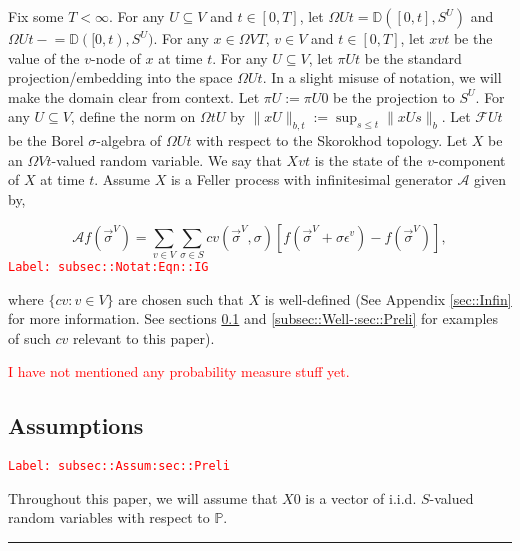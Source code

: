\documentclass[12pt]{article}
\newcommand{\mb}{\mathbb}
\newcommand{\mc}{\mathcal}
\newcommand{\ep}{\epsilon}
\newcommand{\tr}{\textcolor{red}}
\newcommand{\labe}[1]{\tr{\texttt{Label: #1}}}
\newcommand{\ind}{\hspace{24pt}}
\newcommand{\lin}{\rule{\linewidth}{0.4 pt}}
\newcommand{\pr}{\mb{P}}							%
\newcommand{\defeq}{:=}								%
\newcommand{\cad}{\mb{D}}							%
\renewcommand{\v}{v}							%
\renewcommand{\U}{U}							%
\renewcommand{\S}{S}							%
\newcommand{\s}{\sigma}							%
\newcommand{\sv}{\vec{\s}}						%
\renewcommand{\b}{b}							%
\newcommand{\ev}{\ep}							%
\newcommand{\T}{T}								%
\newcommand{\x}{x}								%
\renewcommand{\t}{t}							%
\newcommand{\proj}{\pi}							%
\renewcommand{\tt}{s}							%
\newcommand{\F}{\mc{F}}							%
\newcommand{\X}{X}								%
\newcommand{\IG}{\mc{A}}						%
\newcommand{\IGr}{c}							%
\newcommand{\vind}[1]{^{#1}}					%
\newcommand{\carp}[1]{^{#1}}					%
\newcommand{\vsi}[1]{^{#1}}						%
\newcommand{\cind}[1]{_{#1}}					%
\begin{document}
\ind Fix some \(\T < \infty\). For any \(\U\subseteq V\) and \(\t\in [0,\T]\), let \(\Omega{\U}{\t} = \cad([0,\t],\S\carp{\U})\) and \(\Omega{\U}{\t-} = \cad([0,\t),\S\carp{\U})\). For any \(\x{}{} \in \Omega{V}{\T}\), \(\v\in V\) and  \(\t \in [0,\T]\), let \(\x{\v}{\t}\) be the value of the \(\v\)-node of \(\x{}{}\) at time \(\t\). For any \(\U\subseteq V\), let \(\proj{\U}{\t}\) be the standard projection/embedding into the space \(\Omega{\U}{\t}\). In a slight misuse of notation, we will make the domain clear from context. Let \(\proj{\U}{} \defeq \proj{\U}{0}\) be the projection to \(\S\carp{\U}\). For any \(\U\subseteq V\), define the norm on \(\Omega{\t}{\U}\) by \(\|\x{\U}{}\|_{\b{},\t} \defeq \sup_{\tt \leq \t} \|\x{\U}{\tt}\|_{\b{}}\). Let \(\F{\U}{\t}\) be the Borel \(\sigma\)-algebra of \(\Omega{\U}{\t}\) with respect to the Skorokhod topology. Let \(\X{}{}\) be an \(\Omega{V}{\t}\)-valued random variable. We say that \(\X{\v}{\t}\) is the state of the \(\v\)-component of \(\X{}{}\) at time \(\t\). Assume \(\X{}{}\) is a Feller process with infinitesimal generator \(\IG\) given by,

\begin{equation}
\IG f(\sv\cind{}\vsi{V}) = \sum_{\v \in V}\sum_{\s \in \S} \IGr{\v}(\sv\cind{}\vsi{V},\s)[f(\sv\cind{}\vsi{V} + \s \ev\vind{\v}) - f(\sv\cind{}\vsi{V})],
\label{subsec::Notat:Eqn::IG}
\end{equation}
\labe{subsec::Notat:Eqn::IG}

where \(\{\IGr{\v}:\v\in V\}\) are chosen such that \(\X{}{}\) is well-defined (See Appendix \ref{sec::Infin} for more information. See sections \ref{subsec::Assum:sec::Preli} and \ref{subsec::Well-:sec::Preli} for examples of such \(\IGr{\v}\) relevant to this paper). 

\tr{I have not mentioned any probability measure stuff yet.}

\subsection{Assumptions}
\label{subsec::Assum:sec::Preli}\labe{subsec::Assum:sec::Preli}

Throughout this paper, we will assume that \(\X{}{0}\) is a vector of i.i.d. \(\S\)-valued random variables with respect to \(\pr\).

\lin
\end{document}
